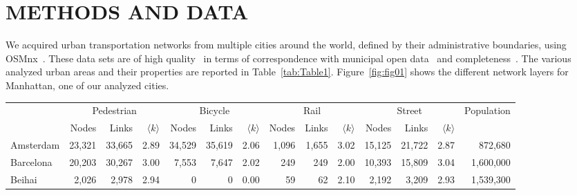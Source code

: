 \section{METHODS AND DATA}
We acquired urban transportation networks from multiple cities around the world, defined by their administrative boundaries, using OSMnx~\cite{Boeing2017OSMNX}. These data sets are of high quality~\cite{Haklay2010OpenStreetMap,Girres2010Quality} in terms of correspondence with municipal open data~\cite{Ferster2019Bicycle} and completeness~\cite{Barbosa-Filho2017Models}. The various analyzed urban areas and their properties are reported in Table~\ref{tab:Table1}. Figure~\ref{fig:fig01} shows the different network layers for Manhattan, one  of our analyzed cities.

\begin{table}[ht!]
	\centering
	\begin{adjustbox}{width=\textwidth,keepaspectratio}
		\begin{tabular}{l|rrr|rrr|rrr|rrr|r}
			{}         & \multicolumn{3}{c|}{Pedestrian} & \multicolumn{3}{c|}{Bicycle} & \multicolumn{3}{c|}{Rail} & \multicolumn{3}{c|}{Street} & Population                                                                                                                      \\
			{}         & Nodes                           & Links                        & $\langle k \rangle$       & Nodes                       & Links      & $\langle k \rangle$ & Nodes & Links & $\langle k \rangle$ & Nodes   & Links   & {$\langle k \rangle$}              \\
			\midrule
			Amsterdam  & 23,321                          & 33,665                       & 2.89                      & 34,529                      & 35,619     & 2.06                & 1,096 & 1,655 & 3.02                & 15,125  & 21,722  & 2.87                  & 872,680    \\
			Barcelona  & 20,203                          & 30,267                       & 3.00                      & 7,553                       & 7,647      & 2.02                & 249   & 249   & 2.00                & 10,393  & 15,809  & 3.04                  & 1,600,000  \\
			Beihai     & 2,026                           & 2,978                        & 2.94                      & 0                           & 0          & 0.00                & 59    & 62    & 2.10                & 2,192   & 3,209   & 2.93                  & 1,539,300  \\

\end{tabular}
\end{adjustbox}
\end{table}
